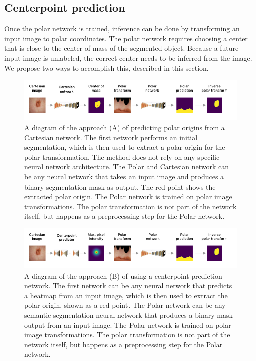     \subsection{Centerpoint prediction}
    
Once the polar network is trained, inference can be done by transforming an input image to polar 
coordinates. The polar network requires choosing a center that is close to the center of mass of the 
segmented object. Because a future input image is unlabeled, the correct center needs to be inferred from 
the image. We propose two ways to accomplish this, described in this section.
	
	\pagebreak

	\begin{figure}[t!]
		\centering
		\includegraphics[width=\linewidth]{images/4/retraining-approach}
		\caption{A diagram of the approach (A) of predicting polar origins from a Cartesian network. The first network performs an initial segmentation, which is then used to extract a polar origin for the polar transformation. The method does not rely on any specific neural network architecture. The Polar and Cartesian network can be any neural network that takes an input image and produces a binary segmentation mask as output. The red point shows the extracted polar origin. The Polar network is trained on polar image transformations. The polar transformation is not part of the network itself, but happens as a preprocessing step for the Polar network. \cite{bencevicTrainingPolarImage2021}}
		\label{fig:retraining-diagram}
	\end{figure}
	
		\begin{figure}[t!]
		\centering
		\includegraphics[width=\linewidth]{images/4/centerpoint-approach}
		\caption{A diagram of the approach (B) of using a centerpoint prediction network. The first network can be any neural network that predicts a heatmap from an input image, which is then used to extract the polar origin, shown as a red point. The Polar network can be any semantic segmentation neural network that produces a binary mask output from an input image. The Polar network is trained on polar image transformations. The polar transformation is not part of the network itself, but happens as a preprocessing step for the Polar network. \cite{bencevicTrainingPolarImage2021}}
		\label{fig:centerpoint-approach}
	\end{figure}

